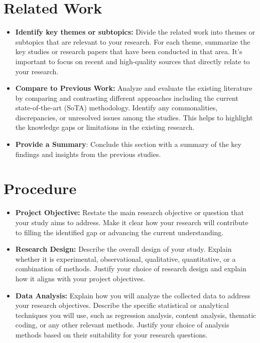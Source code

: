 \documentclass[conference]{IEEEtran}
\begin{document}
\section{Related Work}
\begin{itemize}
	\item \textbf{Identify key themes or subtopics:} Divide the related work into themes or subtopics that are relevant to your research. For each theme, summarize the key studies or research papers that have been conducted in that area. It's important to focus on recent and high-quality sources that directly relate to your research.
	\item \textbf{Compare to Previous Work:} Analyze and evaluate the existing literature by comparing and contrasting different approaches including the current state-of-the-art (SoTA) methodology. Identify any commonalities, discrepancies, or unresolved issues among the studies. This helps to highlight the knowledge gaps or limitations in the existing research.
	\item \textbf{Provide a Summary}: Conclude this section with a summary of the key findings and insights from the previous studies.
\end{itemize}

\section{Procedure}
\begin{itemize}
	\item \textbf{Project Objective:} Restate the main research objective or question that your study aims to address. Make it clear how your research will contribute to filling the identified gap or advancing the current understanding.
	\item \textbf{Research Design:} Describe the overall design of your study. Explain whether it is experimental, observational, qualitative, quantitative, or a combination of methods. Justify your choice of research design and explain how it aligns with your project objectives.
	\item \textbf{Data Analysis:} Explain how you will analyze the collected data to address your research objectives. Describe the specific statistical or analytical techniques you will use, such as regression analysis, content analysis, thematic coding, or any other relevant methods. Justify your choice of analysis methods based on their suitability for your research questions.
\end{itemize}
\end{document}
